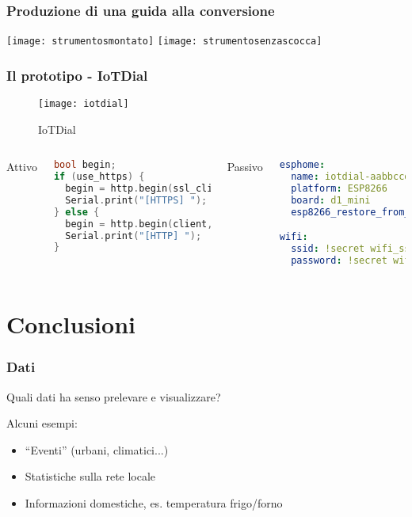 \documentclass[aspectratio=169]{beamer}
\begin{document}
\begin{frame}
\frametitle{Produzione di una guida alla conversione}
\centering
\texttt{[image: strumentosmontato]}
\enspace
\texttt{[image: strumentosenzascocca]}
\end{frame}


\begin{frame}
\frametitle{Il prototipo - IoTDial}
\begin{figure}[h]
  \centering
  \texttt{[image: iotdial]}
  \caption{IoTDial}
\end{figure}

\framebreak

\begin{columns}
Attivo
\begin{lstlisting}[language=cpp]
bool begin;
if (use_https) {
  begin = http.begin(ssl_client, apiUrl);
  Serial.print("[HTTPS] ");
} else {
  begin = http.begin(client, apiUrl);
  Serial.print("[HTTP] ");
}
\end{lstlisting}

Passivo
\begin{lstlisting}[language=yaml]
esphome:
  name: iotdial-aabbccdd
  platform: ESP8266
  board: d1_mini
  esp8266_restore_from_flash: yes

wifi:
  ssid: !secret wifi_ssid
  password: !secret wifi_password
\end{lstlisting}
\end{columns}
\end{frame}


\section{Conclusioni}
\begin{frame}
\frametitle{Dati}
Quali dati ha senso prelevare e visualizzare?
\vspace{1cm}

Alcuni esempi:
\begin{itemize}
  \item ``Eventi'' (urbani, climatici...)
  \item Statistiche sulla rete locale
  \item Informazioni domestiche, es. temperatura frigo/forno
\end{itemize}
\end{frame}
\end{document}
